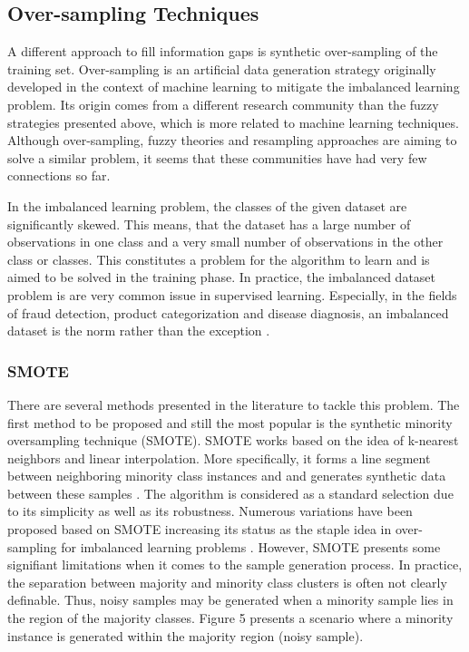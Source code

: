 \documentclass[parskip=full]{scrartcl}
\begin{document}
\subsection{Over-sampling Techniques}

A different approach to fill information gaps is synthetic over-sampling of the
training set. Over-sampling is an artificial data generation strategy originally
developed in the context of machine learning to mitigate the imbalanced learning
problem. Its origin comes from a different research community than the fuzzy
strategies presented above, which is more related to machine learning
techniques. Although over-sampling, fuzzy theories and resampling approaches are
aiming to solve a similar problem, it seems that these communities have had very
few connections so far. 

In the imbalanced learning problem, the classes of the given dataset are
significantly skewed. This means, that the dataset has a large number of
observations in one class and a very small number of observations in the other
class or classes. This constitutes a problem for the algorithm to learn and is
aimed to be solved in the training phase. In practice, the imbalanced dataset
problem is are very common issue in supervised learning. Especially, in the
fields of fraud detection, product categorization and disease diagnosis, an
imbalanced dataset is the norm rather than the exception \cite{He.2013}. 

\subsubsection{SMOTE}

There are several methods presented in the literature to tackle this problem.
The first method to be proposed and still the most popular is the synthetic
minority oversampling technique (SMOTE). SMOTE works based on the idea of
k-nearest neighbors and linear interpolation. More specifically, it forms a line
segment between neighboring minority class instances and and generates synthetic
data between these samples \cite{Chawla.2002}. The algorithm is considered as a
standard selection due to its simplicity
as well as its robustness. Numerous variations have been proposed based on SMOTE
increasing its status as the staple idea in over-sampling for imbalanced learning
problems \cite{Fernandez.2018}. However, SMOTE presents some signifiant
limitations when it comes to the sample generation process. In practice, the
separation between majority and minority class clusters is often not clearly
definable. Thus, noisy samples may be generated when a minority sample lies in
the region of the majority classes. Figure 5 presents a scenario where a
minority instance is generated within the majority region (noisy sample).
\end{document}
